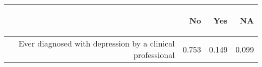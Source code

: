 \documentclass{article}\usepackage[]{graphicx}\usepackage[]{color}
\begin{document}
\begin{table}[ht]
\centering
\begin{tabular}{rrrr}
  \hline
 & \begin{sideways} No \end{sideways} & \begin{sideways} Yes \end{sideways} & \begin{sideways} NA \end{sideways} \\ 
  \hline
	Ever diagnosed with depression by a clinical professional & 0.753 & 0.149 & 0.099 \\ 
   \hline
\end{tabular}
\end{table}
\end{document}
